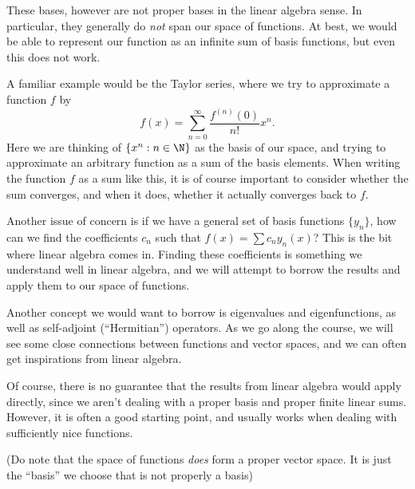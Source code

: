 \documentclass[a4paper]{article}
\begin{document}
These bases, however are not proper bases in the linear algebra sense. In particular, they generally do \emph{not} span our space of functions. At best, we would be able to represent our function as an infinite sum of basis functions, but even this does not work.

A familiar example would be the Taylor series, where we try to approximate a function $f$ by
\[
  f(x) = \sum_{n = 0}^\infty \frac{f^{(n)}(0)}{n!} x^n.
\]
Here we are thinking of $\{x^n: n \in \N\}$ as the basis of our space, and trying to approximate an arbitrary function as a sum of the basis elements. When writing the function $f$ as a sum like this, it is of course important to consider whether the sum converges, and when it does, whether it actually converges back to $f$.

Another issue of concern is if we have a general set of basis functions $\{y_n\}$, how can we find the coefficients $c_n$ such that $f(x) = \sum c_n y_n(x)$? This is the bit where linear algebra comes in. Finding these coefficients is something we understand well in linear algebra, and we will attempt to borrow the results and apply them to our space of functions.

Another concept we would want to borrow is eigenvalues and eigenfunctions, as well as self-adjoint (``Hermitian'') operators. As we go along the course, we will see some close connections between functions and vector spaces, and we can often get inspirations from linear algebra.

Of course, there is no guarantee that the results from linear algebra would apply directly, since we aren't dealing with a proper basis and proper finite linear sums. However, it is often a good starting point, and usually works when dealing with sufficiently nice functions.

(Do note that the space of functions \emph{does} form a proper vector space. It is just the ``basis'' we choose that is not properly a basis)
\end{document}
